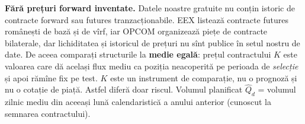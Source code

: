 %
{\textbf{Fără prețuri forward inventate.} Datele noastre gratuite nu conțin istoric de contracte forward sau futures tranzacționabile. EEX listează contracte futures românești de bază și de vîrf, iar OPCOM organizează piețe de contracte bilaterale,
dar lichiditatea și istoricul de prețuri nu sînt publice în setul nostru de date. De aceea comparați structurile la \textbf{medie egală}: prețul contractului $K$ este valoarea care dă același flux mediu
ca poziția neacoperită pe perioada de \emph{selecție} și apoi rămîne fix pe test. $K$ este un instrument de comparație, nu o prognoză și nu o cotație de piață. Astfel diferă doar riscul.
Volumul planificat $\hat Q_d$ = volumul zilnic mediu din aceeași lună calendaristică a anului anterior (cunoscut la semnarea contractului).}
